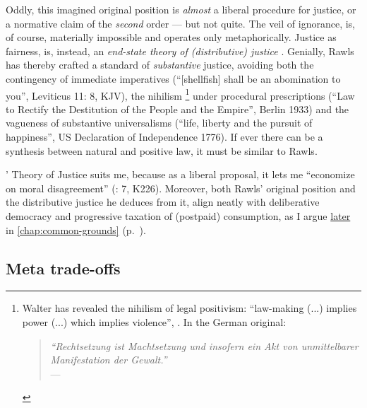 Oddly, this imagined original position is \emph{almost} a liberal procedure for justice, or a normative claim of the \emph{second} order --- but not quite. %
The veil of ignorance, is, of course, materially impossible and operates only metaphorically. 
Justice as fairness, is, instead, an \emph{end-state theory of (distributive) justice} \citep[1007]{Fried1999}. 
Genially, Rawls has thereby crafted a standard of \emph{substantive} justice, avoiding both the contingency of immediate imperatives (``[shellfish] shall be an abomination to you'', Leviticus 11: 8, KJV), the nihilism 
\footnote{
	Walter \citeauthor{Benjamin1927} has revealed the nihilism of legal positivism: ``law-making (...) implies power (...) which implies violence'', \citep[12, own translation]{Benjamin1927}. In the German original:
		\begin{quote}
			\emph{``Rechtsetzung ist Machtsetzung und insofern ein Akt von unmittelbarer Manifestation der Gewalt.''}\\
			--- \citealt[12]{Benjamin1927}
		\end{quote}
}
under procedural prescriptions (``Law to Rectify the Destitution of the People and the Empire'', Berlin 1933) and the vagueness of substantive universalisms (``life, liberty and the pursuit of happiness'', US Declaration of Independence 1776). 
If ever there can be a synthesis between natural and positive law, it must be similar to Rawls.

\citeauthor{Rawls-1971-aa}' Theory of Justice suits me, because as a liberal proposal, it lets me ``economize on moral disagreement'' (\citealt{GutmannThompson-2004-aa}: 7,  K226). 
Moreover, both Rawls' original position and the distributive justice he deduces from it, align neatly with deliberative democracy and progressive taxation of (postpaid) consumption, as I argue \hyperref[chap:common-grounds]{later} in \autoref{chap:common-grounds} (p.~\pageref{chap:common-grounds}). %



\subsection[trade-offs]{Meta trade-offs}

